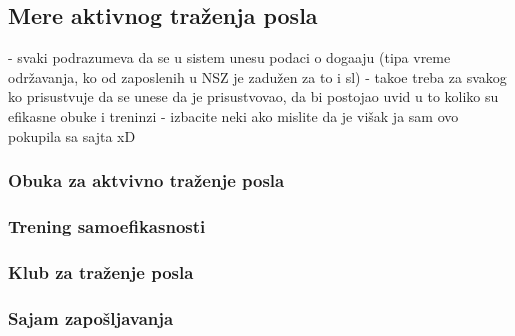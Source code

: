 \subsection{Mere aktivnog tra\v zenja posla}

- svaki podrazumeva da se u sistem unesu podaci o doga\dj aju (tipa vreme odr\v zavanja, ko od zaposlenih u NSZ je zadu\v zen za to i sl)
- tako\dj e treba za svakog ko prisustvuje da se unese da je prisustvovao, da bi postojao uvid u to koliko su efikasne obuke i treninzi
- izbacite neki ako mislite da je vi\v sak ja sam ovo pokupila sa sajta  xD

\subsubsection{Obuka za aktvivno tra\v zenje posla}

\subsubsection{Trening samoefikasnosti}

\subsubsection{Klub za tra\v zenje posla}

\subsubsection{Sajam zapo\v sljavanja}